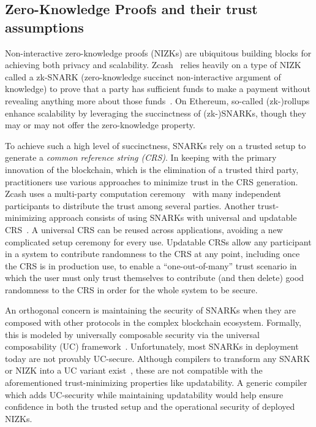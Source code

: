 \subsection{Zero-Knowledge Proofs and their trust assumptions}

Non-interactive zero-knowledge proofs (NIZKs) are ubiquitous building blocks for achieving both privacy and scalability. Zcash~\cite{zcash} relies heavily on a type of NIZK called a zk-SNARK (zero-knowledge succinct non-interactive argument of knowledge) to prove that a party has sufficient funds to make a payment without revealing anything more about those funds~\cite{SP:BCGGMT14}. On Ethereum, so-called (zk-)rollups enhance scalability by leveraging the succinctness of (zk-)SNARKs, though they may or may not offer the zero-knowledge property.

To achieve such a high level of succinctness, SNARKs rely on a trusted setup to generate a \emph{common reference string (CRS)}. In keeping with the primary innovation of the blockchain, which is the elimination of a trusted third party, practitioners use various approaches to minimize trust in the CRS generation. Zcash uses a multi-party computation ceremony~\cite{zcash-ceremony} with many independent participants to distribute the trust among several parties. Another trust-minimizing approach consists of using SNARKs with universal and updatable CRS~\cite{C:GKMMM18,CCS:MBKM19,EC:CHMMVW20,EPRINT:GabWilCio19}. A universal CRS can be reused across applications, avoiding a new complicated setup ceremony for every use. Updatable CRSs allow any participant in a system to contribute randomness to the CRS at any point, including once the CRS is in production use, to enable a ``one-out-of-many'' trust scenario in which the user must only trust themselves to contribute (and then delete) good randomness to the CRS in order for the whole system to be secure.

An orthogonal concern is maintaining the security of SNARKs when they are composed with other protocols in the complex blockchain ecosystem. Formally, this is modeled by universally composable security via the universal composability (UC) framework~\cite{FOCS:Canetti01}. Unfortunately, most SNARKs in deployment today are not provably UC-secure. Although compilers to transform any SNARK or NIZK into a UC variant exist~\cite{EPRINT:KZMQCP15,EC:GKOPTT23}, these are not compatible with the aforementioned trust-minimizing properties like updatability. A generic compiler which adds UC-security while maintaining updatability would help ensure confidence in both the trusted setup and the operational security of deployed NIZKs.

